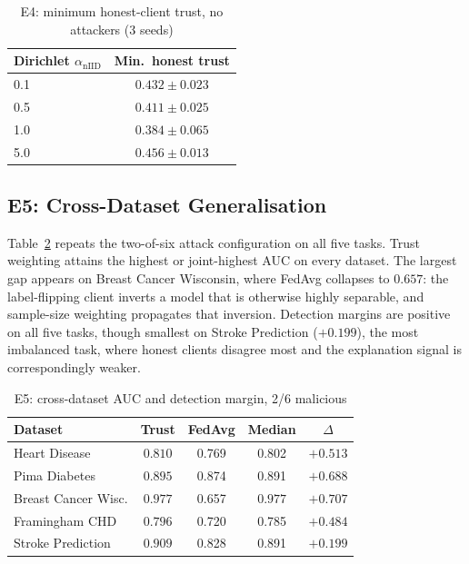 \documentclass[10pt,twocolumn,letterpaper]{article}
\begin{document}
\begin{table}[t]
 \caption{E4: minimum honest-client trust, no attackers (3 seeds)}
 \label{tab:e4}
 \centering
 \small
 \begin{tabular}{lc}
 \toprule
 Dirichlet $\alpha_{\mathrm{nIID}}$ & Min.\ honest trust \\
 \midrule
 0.1 & $0.432 \pm 0.023$ \\
 0.5 & $0.411 \pm 0.025$ \\
 1.0 & $0.384 \pm 0.065$ \\
 5.0 & $0.456 \pm 0.013$ \\
 \bottomrule
 \end{tabular}
\end{table}

\subsection{E5: Cross-Dataset Generalisation}
\label{sec:e5}
Table~\ref{tab:e5} repeats the two-of-six attack configuration on all five
tasks. Trust weighting attains the highest or joint-highest AUC on every
dataset. The largest gap appears on Breast Cancer Wisconsin, where FedAvg
collapses to $0.657$: the label-flipping client inverts a model that is
otherwise highly separable, and sample-size weighting propagates that
inversion. Detection margins are positive on all five tasks, though smallest
on Stroke Prediction ($+0.199$), the most imbalanced task, where honest
clients disagree most and the explanation signal is correspondingly weaker.

\begin{table}[t]
 \caption{E5: cross-dataset AUC and detection margin, 2/6 malicious}
 \label{tab:e5}
 \centering
 \small
 \begin{tabular}{lcccc}
 \toprule
 Dataset & Trust & FedAvg & Median & $\Delta$ \\
 \midrule
 Heart Disease & $\mathbf{0.810}$ & 0.769 & 0.802 & $+0.513$ \\
 Pima Diabetes & $\mathbf{0.895}$ & 0.874 & 0.891 & $+0.688$ \\
 Breast Cancer Wisc. & $\mathbf{0.977}$ & 0.657 & $\mathbf{0.977}$ &
 $+0.707$ \\
 Framingham CHD & $\mathbf{0.796}$ & 0.720 & 0.785 & $+0.484$ \\
 Stroke Prediction & $\mathbf{0.909}$ & 0.828 & 0.891 & $+0.199$ \\
 \bottomrule
 \end{tabular}
\end{table}
\end{document}
